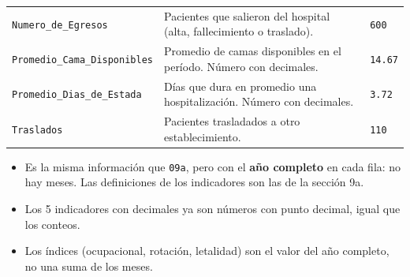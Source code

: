 \documentclass[10.5pt]{article}
\begin{document}
\begin{xltabular}{\linewidth}{@{}p{4.5cm} >{\raggedright\arraybackslash}X p{3.4cm}@{}}
\texttt{Numero\_\allowbreak{}de\_\allowbreak{}Egresos} & Pacientes que salieron del hospital (alta, fallecimiento o traslado). & \texttt{600} \\
\texttt{Promedio\_\allowbreak{}Cama\_\allowbreak{}Disponibles} & Promedio de camas disponibles en el período. Número con decimales. & \texttt{14.67} \\
\texttt{Promedio\_\allowbreak{}Dias\_\allowbreak{}de\_\allowbreak{}Estada} & Días que dura en promedio una hospitalización. Número con decimales. & \texttt{3.72} \\
\texttt{Traslados} & Pacientes trasladados a otro establecimiento. & \texttt{110} \\
\end{xltabular}

\begin{alertabox}
\begin{itemize}[leftmargin=1.1em,itemsep=2pt,topsep=2pt]
\item Es la misma información que \texttt{09a}, pero con el \textbf{año completo} en cada fila: no hay meses. Las definiciones de los indicadores son las de la sección 9a.
\item Los 5 indicadores con decimales ya son números con punto decimal, igual que los conteos.
\item Los índices (ocupacional, rotación, letalidad) son el valor del año completo, no una suma de los meses.
\end{itemize}
\end{alertabox}
\end{document}
